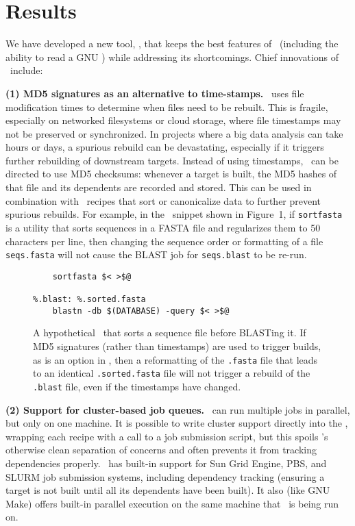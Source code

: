 \section*{Results}

We have developed a new tool, \biomake, that keeps the best features of \make\ (including the ability to read a GNU \Makefile) while addressing its shortcomings.
Chief innovations of \biomake\ include:

{\bf (1) MD5 signatures as an alternative to time-stamps.}
\make\ uses file modification times to determine when files need to be rebuilt.
This is fragile, especially on networked filesystems or cloud storage, where file timestamps may not be preserved or synchronized.
In projects where a big data analysis can take hours or days, a spurious rebuild can be devastating, especially if it triggers further rebuilding of downstream targets.
Instead of using timestamps, \biomake\ can be directed to use MD5 checksums: whenever a target is built, the MD5 hashes of that file and its dependents are recorded
and stored. This can be used in combination with \Makefile\ recipes that sort or canonicalize data to further prevent spurious rebuilds.
For example, in the \Makefile\ snippet shown in Figure~1,
if {\tt sortfasta} is a utility that sorts sequences in a FASTA file and regularizes them to 50 characters per line, then changing the sequence order or formatting
of a file {\tt seqs.fasta} will not cause the BLAST job for {\tt seqs.blast} to be re-run.

\begin{figure}[H]
\begin{Verbatim}[frame=single]
%.sorted.fasta: %.fasta
    sortfasta $< >$@

%.blast: %.sorted.fasta
    blastn -db $(DATABASE) -query $< >$@
\end{Verbatim}
\caption{
  A hypothetical \Makefile\ that sorts a sequence file before BLASTing it.
  If MD5 signatures (rather than timestamps) are used to trigger builds, as is an option in \biomake,
  then a reformatting of the {\tt .fasta} file that leads to an identical {\tt .sorted.fasta} file
  will not trigger a rebuild of the {\tt .blast} file, even if the timestamps have changed.
}
\end{figure}

{\bf (2) Support for cluster-based job queues.}
\make\ can run multiple jobs in parallel, but only on one machine.
It is possible to write cluster support directly into the \Makefile,
wrapping each recipe with a call to a job submission script,
but this spoils \make's otherwise clean separation of concerns
and often prevents it from tracking dependencies properly.
\biomake\ has built-in support for Sun Grid Engine, PBS, and SLURM job submission systems,
including dependency tracking (ensuring a target is not built until all its dependents have been built).
It also (like GNU Make) offers built-in parallel execution on
the same machine that \biomake\ is being run on.

